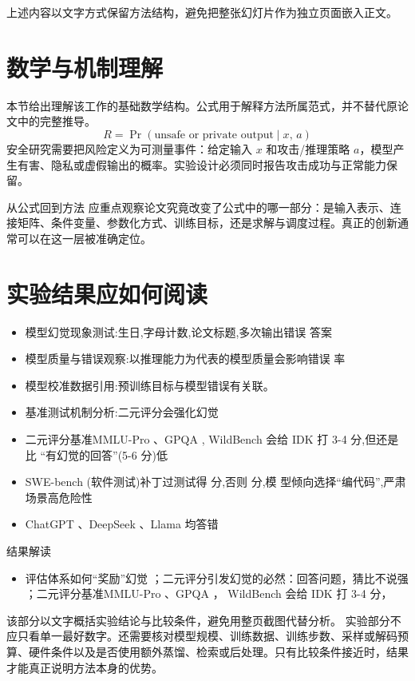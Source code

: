 \documentclass[UTF8,11pt,a4paper]{ctexart}
\begin{document}
上述内容以文字方式保留方法结构，避免把整张幻灯片作为独立页面嵌入正文。

\section{数学与机制理解}
本节给出理解该工作的基础数学结构。公式用于解释方法所属范式，并不替代原论文中的完整推导。
\begin{equation}
R=\Pr(\text{unsafe or private output}\mid x,\,a)
\end{equation}
安全研究需要把风险定义为可测量事件：给定输入 $x$ 和攻击/推理策略 $a$，模型产生有害、隐私或虚假输出的概率。实验设计必须同时报告攻击成功与正常能力保留。

\begin{keybox}{从公式回到方法}
应重点观察论文究竟改变了公式中的哪一部分：是输入表示、连接矩阵、条件变量、参数化方式、训练目标，还是求解与调度过程。真正的创新通常可以在这一层被准确定位。
\end{keybox}


\section{实验结果应如何阅读}
\begin{itemize}
\item 模型幻觉现象测试:生日,字母计数,论文标题,多次输出错误 答案
\item 模型质量与错误观察:以推理能力为代表的模型质量会影响错误 率
\item 模型校准数据引用:预训练目标与模型错误有关联。
\item 基准测试机制分析:二元评分会强化幻觉
\item 二元评分基准MMLU-Pro 、GPQA , WildBench 会给 IDK 打 3-4 分,但还是比 “有幻觉的回答”(5-6 分)低
\item SWE-bench (软件测试)补丁过测试得 分,否则 分,模 型倾向选择“编代码”,严肃场景高危险性
\item ChatGPT 、DeepSeek 、Llama 均答错
\end{itemize}

\begin{notebox}{结果解读}
\begin{itemize}
\item 评估体系如何“奖励”幻觉 ；二元评分引发幻觉的必然：回答问题，猜比不说强 ；二元评分基准MMLU-Pro 、GPQA ， WildBench 会给 IDK 打 3-4 分，
\end{itemize}
\end{notebox}

该部分以文字概括实验结论与比较条件，避免用整页截图代替分析。
实验部分不应只看单一最好数字。还需要核对模型规模、训练数据、训练步数、采样或解码预算、硬件条件以及是否使用额外蒸馏、检索或后处理。只有比较条件接近时，结果才能真正说明方法本身的优势。
\end{document}
